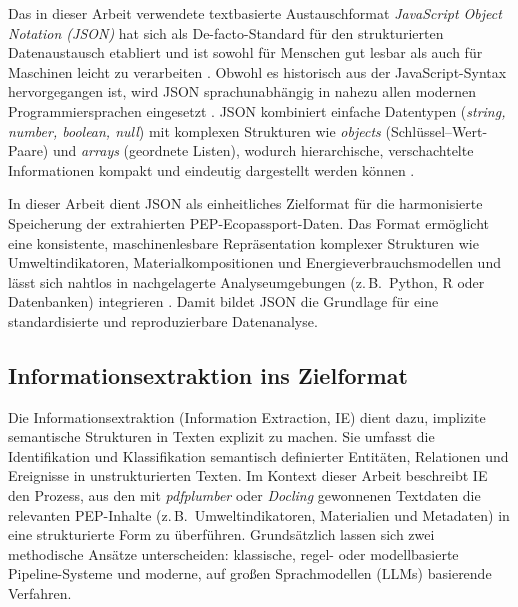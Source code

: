 Das in dieser Arbeit verwendete textbasierte Austauschformat \emph{JavaScript Object Notation (JSON)} 
hat sich als De-facto-Standard für den strukturierten Datenaustausch etabliert und ist sowohl für Menschen gut lesbar 
als auch für Maschinen leicht zu verarbeiten \cite{Pezoa2016}. 
Obwohl es historisch aus der JavaScript-Syntax hervorgegangen ist, wird JSON sprachunabhängig in nahezu allen modernen 
Programmiersprachen eingesetzt \cite{Pezoa2016}. 
JSON kombiniert einfache Datentypen (\emph{string, number, boolean, null}) mit komplexen Strukturen wie 
\emph{objects} (Schlüssel–Wert-Paare) und \emph{arrays} (geordnete Listen), wodurch hierarchische, verschachtelte Informationen 
kompakt und eindeutig dargestellt werden können \cite{Pezoa2016}. 

In dieser Arbeit dient JSON als einheitliches Zielformat für die harmonisierte Speicherung der extrahierten PEP-Ecopassport-Daten. 
Das Format ermöglicht eine konsistente, maschinenlesbare Repräsentation komplexer Strukturen wie Umweltindikatoren, 
Materialkompositionen und Energieverbrauchsmodellen und lässt sich nahtlos in nachgelagerte Analyseumgebungen 
(z.\,B.\ Python, R oder Datenbanken) integrieren \cite{Pezoa2016}. 
Damit bildet JSON die Grundlage für eine standardisierte und reproduzierbare Datenanalyse.


\subsection{Informationsextraktion ins Zielformat}

Die Informationsextraktion (Information Extraction, IE) dient dazu, implizite semantische Strukturen in Texten explizit zu machen. 
Sie umfasst die Identifikation und Klassifikation semantisch definierter Entitäten, Relationen und Ereignisse in unstrukturierten Texten. \cite{Grishman2015} 
Im Kontext dieser Arbeit beschreibt IE den Prozess, aus den mit \emph{pdfplumber} oder
\emph{Docling} gewonnenen Textdaten die relevanten PEP-Inhalte (z.\,B.\ Umweltindikatoren, Materialien und Metadaten) 
in eine strukturierte Form zu überführen. 
Grundsätzlich lassen sich zwei methodische Ansätze unterscheiden: klassische, regel- oder modellbasierte 
Pipeline-Systeme und moderne, auf großen Sprachmodellen (LLMs) basierende Verfahren.

